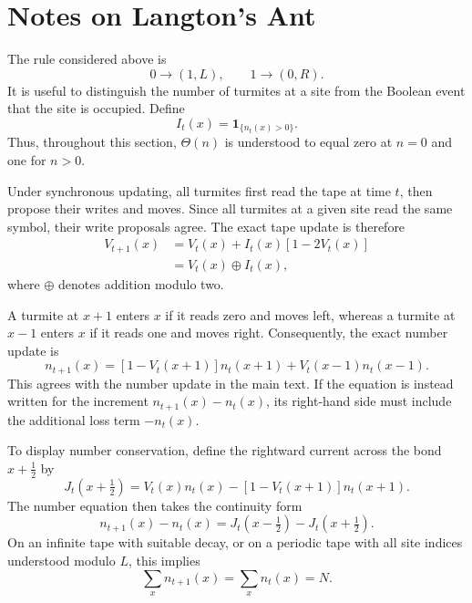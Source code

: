 \documentclass{article}
\begin{document}
\section{Notes on Langton's Ant}

The rule considered above is
\begin{equation}
0 \longrightarrow (1,L),
\qquad
1 \longrightarrow (0,R).
\end{equation}
It is useful to distinguish the number of turmites at a site from the Boolean
event that the site is occupied.  Define
\begin{equation}
I_t(x) = \mathbf{1}_{\{n_t(x)>0\}}.
\end{equation}
Thus, throughout this section, $\Theta(n)$ is understood to equal zero at
$n=0$ and one for $n>0$.

Under synchronous updating, all turmites first read the tape at time $t$,
then propose their writes and moves.  Since all turmites at a given site read
the same symbol, their write proposals agree.  The exact tape update is
therefore
\begin{align}
V_{t+1}(x)
&= V_t(x) + I_t(x)\left[1-2V_t(x)\right] \\
&= V_t(x) \mathbin{\oplus} I_t(x),
\end{align}
where $\oplus$ denotes addition modulo two.

A turmite at $x+1$ enters $x$ if it reads zero and moves left, whereas a
turmite at $x-1$ enters $x$ if it reads one and moves right.  Consequently,
the exact number update is
\begin{equation}
\boxed{
n_{t+1}(x)
= \left[1-V_t(x+1)\right]n_t(x+1)
+ V_t(x-1)n_t(x-1).
}
\label{eq:exact-number-update}
\end{equation}
This agrees with the number update in the main text.  If the equation is
instead written for the increment $n_{t+1}(x)-n_t(x)$, its right-hand side
must include the additional loss term $-n_t(x)$.

To display number conservation, define the rightward current across the bond
$x+\tfrac12$ by
\begin{equation}
J_t\left(x+\tfrac12\right)
= V_t(x)n_t(x)
- \left[1-V_t(x+1)\right]n_t(x+1).
\end{equation}
The number equation then takes the continuity form
\begin{equation}
n_{t+1}(x)-n_t(x)
= J_t\left(x-\tfrac12\right)-J_t\left(x+\tfrac12\right).
\end{equation}
On an infinite tape with suitable decay, or on a periodic tape with all site
indices understood modulo $L$, this implies
\begin{equation}
\sum_x n_{t+1}(x)=\sum_x n_t(x)=N.
\end{equation}
\end{document}
